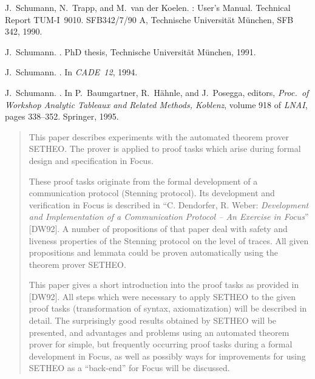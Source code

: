 \begin{thebibliography}{}
J.~Schumann, N.~Trapp, and {M.\ van der} Koelen.
: {U}ser's {M}anual.
\newblock Technical Report TUM-I\ 9010. SFB342/7/90 A, Technische
  {Universit\"at M\"unchen}, SFB 342, 1990.

J.~Schumann.
.
\newblock PhD thesis, Technische Universit\"at M\"unchen, 1991.

J.~Schumann.
.
\newblock In {\em CADE~12}, 1994.


J.~Schumann.
.
\newblock In P.~Baumgartner, R.~H{\"a}hnle, and J.~Posegga, editors, {\em
  Proc.~of Workshop Analytic Tableaux and Related Methods, Koblenz}, volume 918
  of {\em LNAI}, pages 338--352. Springer, 1995.
\begin{quotation}
This paper describes experiments with the automated theorem prover
{\small SETHEO}.
The prover is applied to proof tasks which arise during
formal design and specification in {\sc Focus}.

These proof tasks originate from the formal development of a
communication protocol (Stenning protocol).
Its development and verification in {\sc Focus} is described
in ``C. Dendorfer, R. Weber: {\em Development and Implementation of a
Communication Protocol -- An Exercise in {\sc Focus}\/}'' [DW92].
%
A number of propositions of that paper deal with
safety and liveness properties of the Stenning protocol on the level of
traces.
All given propositions and lemmata could be proven
automatically using the theorem prover {\small SETHEO}.

This paper gives a short introduction into
the proof tasks as provided in [DW92].
All steps which were necessary to apply {\small SETHEO} to the
given proof tasks (transformation of syntax, axiomatization) will be described
in detail.
The surprisingly good results obtained by {\small SETHEO} will be presented,
and advantages and problems using an automated theorem prover
for simple, but  frequently occurring proof tasks during a formal development
in {\sc Focus}, as well as possibly ways for improvements
for using {\small SETHEO} as a ``back-end'' for
{\sc Focus} will be discussed.
\end{quotation}


\end{thebibliography}
